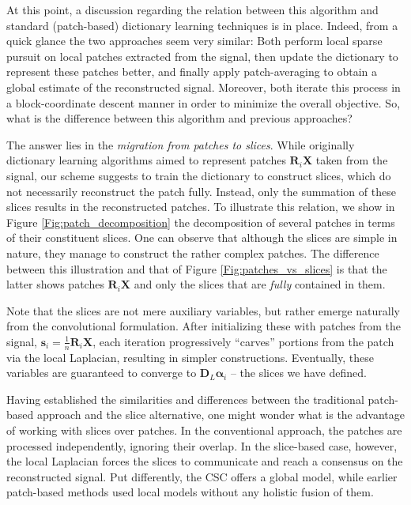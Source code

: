 \documentclass[10pt,twocolumn,letterpaper]{article}
\def\s{{\mathbf s}}
\def\X{{\mathbf X}}
\def\D{{\mathbf D}}
\def\R{{\mathbf R}}
\def\alfa{{\boldsymbol \alpha}}
\begin{document}
At this point, a discussion regarding the relation between this algorithm and standard (patch-based) dictionary learning techniques is in place. Indeed, from a quick glance the two approaches seem very similar: Both perform local sparse pursuit on local patches extracted from the signal, then update the dictionary to represent these patches better, and finally apply patch-averaging to obtain a global estimate of the reconstructed signal. Moreover, both iterate this process in a block-coordinate descent manner in order to minimize the overall objective. So, what is the difference between this algorithm and previous approaches?

The answer lies in the \textit{migration from patches to slices}. While originally dictionary learning algorithms aimed to represent patches $\R_i \X$ taken from the signal, our scheme suggests to train the dictionary to construct slices, which do not necessarily reconstruct the patch fully. Instead, only the summation of these slices results in the reconstructed patches. To illustrate this relation, we show in Figure \ref{Fig:patch_decomposition} the decomposition of several patches in terms of their constituent slices. One can observe that although the slices are simple in nature, they manage to construct the rather complex patches. The difference between this illustration and that of Figure \ref{Fig:patches_vs_slices} is that the latter shows patches $\R_i \X$ and only the slices that are \emph{fully} contained in them.

Note that the slices are not mere auxiliary variables, but rather emerge naturally from the convolutional formulation. After initializing these with patches from the signal, $\s_i = \frac{1}{n} \R_i \X$, each iteration progressively ``carves'' portions from the patch via the local Laplacian, resulting in simpler constructions. Eventually, these variables are guaranteed to converge to $\D_L \alfa_i$ -- the slices we have defined.

Having established the similarities and differences between the traditional patch-based approach and the slice alternative, one might wonder what is the advantage of working with slices over patches. In the conventional approach, the patches are processed independently, ignoring their overlap. In the slice-based case, however, the local Laplacian forces the slices to communicate and reach a consensus on the reconstructed signal. Put differently, the CSC offers a global model, while earlier patch-based methods used local models without any holistic fusion of them.
\end{document}
